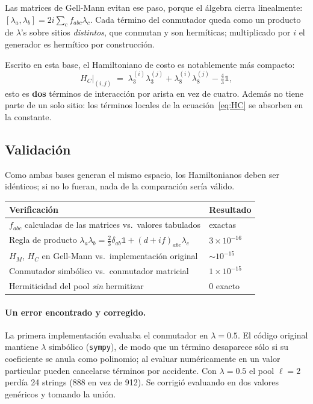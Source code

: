 \documentclass[11pt,a4paper]{article}
\begin{document}
Las matrices de Gell-Mann evitan ese paso, porque el álgebra cierra
linealmente: $[\lambda_a,\lambda_b] = 2i\sum_c f_{abc}\lambda_c$. Cada término
del conmutador queda como un producto de $\lambda$'s sobre sitios
\emph{distintos}, que conmutan y son hermíticas; multiplicado por $i$ el
generador es hermítico por construcción.

Escrito en esta base, el Hamiltoniano de costo es notablemente más compacto:
\begin{equation}
H_C\big|_{(i,j)} \;=\; \lambda_3^{(i)}\lambda_3^{(j)} + \lambda_8^{(i)}\lambda_8^{(j)} - \tfrac{4}{3}\mathbb{1},
\end{equation}
esto es \textbf{dos} términos de interacción por arista en vez de cuatro.
Además no tiene parte de un solo sitio: los términos locales de la
ecuación~\eqref{eq:HC} se absorben en la constante.

\subsection{Validación}

Como ambas bases generan el mismo espacio, los Hamiltonianos deben ser
idénticos; si no lo fueran, nada de la comparación sería válido.

\begin{center}
\begin{tabular}{ll}
\toprule
Verificación & Resultado \\
\midrule
$f_{abc}$ calculadas de las matrices vs.\ valores tabulados & exactas \\
Regla de producto $\lambda_a\lambda_b = \frac{2}{3}\delta_{ab}\mathbb1 + (d+if)_{abc}\lambda_c$ & $3\times10^{-16}$ \\
$H_M$, $H_C$ en Gell-Mann vs.\ implementación original & $\sim10^{-15}$ \\
Conmutador simbólico vs.\ conmutador matricial & $1\times10^{-15}$ \\
Hermiticidad del pool \emph{sin} hermitizar & $0$ exacto \\
\bottomrule
\end{tabular}
\end{center}

\paragraph{Un error encontrado y corregido.} La primera implementación evaluaba
el conmutador en $\lambda=0.5$. El código original mantiene $\lambda$ simbólico
(\texttt{sympy}), de modo que un término desaparece sólo si su coeficiente se
anula como polinomio; al evaluar numéricamente en un valor particular pueden
cancelarse términos por accidente. Con $\lambda=0.5$ el pool $\ell=2$ perdía 24
strings (888 en vez de 912). Se corrigió evaluando en dos valores genéricos y
tomando la unión.
\end{document}
